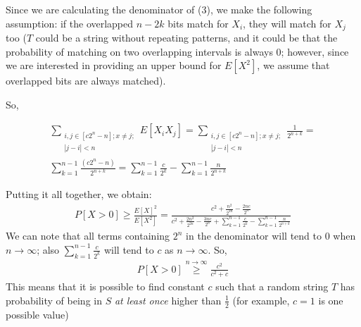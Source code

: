 \documentclass[a4paper,german]{article}
\begin{document}
Since we are calculating the denominator of (3), we make the following assumption: if the overlapped $n - 2k$ bits match for $X_i$, they will match for $X_j$ too ($T$ could be a string without repeating patterns, and it could be that the probability of matching on two overlapping intervals is always 0; however, since we are interested in providing an upper bound for $E[X^2]$, we assume that overlapped bits are always matched).

So,

\begin{equation}
\begin{aligned}
\sum_{\substack{i,j \in [c2^n-n]; x \neq j;\\ |j-i|<n}} E[X_i X_j] = 
	\sum_{\substack{i,j \in [c2^n-n]; x \neq j;\\ |j-i|<n}} \frac{1}{2^{n+k}} = \\
	\sum_{k=1}^{n-1} \frac{(c2^n - n)}{2^{n+k}}  = 
	\sum_{k=1}^{n-1} \frac{c}{2^k} - \sum_{k=1}^{n-1} \frac{n}{2^{n+k}}
\end{aligned}
\end{equation}


Putting it all together, we obtain:
\begin{equation}
\begin{aligned} 
 P[X > 0] \geq  \frac{E[X]^2}{E[X^2]} = 
	\frac{c^2 + \frac{n^2}{2^{2n}} - \frac{2nc}{2^n}}
		{c^2 + \frac{2n^2}{2^{2n}}- \frac{3nc}{2^{n}} + \sum_{k=1}^{n-1}\frac{c}{2^k} - 
		\sum_{k=1}^{n-1}\frac{n}{2^{n+k}} }
\end{aligned}
\end{equation}
We can note that all terms containing $2^n$ in the denominator will tend to 0 when $n \rightarrow \infty$; also $\sum_{k=1}^{n-1}\frac{c}{2^k}$ will tend to $c$ as $n \rightarrow \infty$. So,
\begin{equation}
\begin{aligned} 
	P[X > 0] \overset{n \rightarrow \infty}\geq  
	\frac{c^2 } 
		{c^2 + c} 
\end{aligned}
\end{equation}
This means that it is possible to find constant $c$ such that a random string $T$ has probability of being in $S$ \emph{at least once} higher than $\frac{1}{2}$ (for example, $c = 1$ is one possible value)
\end{document}
